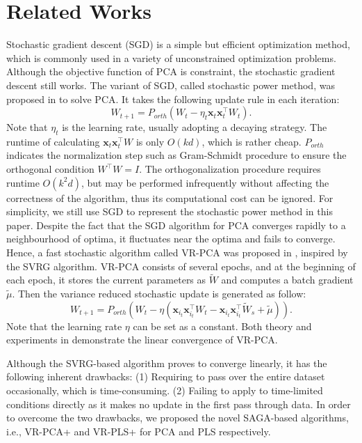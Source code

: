 \documentclass[runningheads,a4paper]{llncs}
\begin{document}
\section{Related Works}
 Stochastic gradient descent (SGD) is a simple but efficient optimization method, which is commonly used in a variety of unconstrained optimization problems. Although the objective function of PCA is constraint, the stochastic gradient descent still works. The variant of SGD, called stochastic power method, was proposed in \citep{Arora2014Stochastic} to solve PCA. It takes the following update rule in each iteration:
 \begin{equation}
 \label{sgd-pca}
 W_{t+1} = P_{orth}(W_{t} - \eta_t \mathbf{x}_{t}\mathbf{x}_{t}^{\top}W_{t}).
 \end{equation}
 Note that $\eta_t$ is the learning rate, usually adopting a decaying strategy.
 The runtime of calculating $\mathbf{x}_{t}\mathbf{x}_{t}^{\top}W$ is only $O(kd)$, which is rather cheap. $P_{orth}$ indicates the normalization step such as  Gram-Schmidt procedure to ensure the orthogonal condition $W^{\top}W=I$. The orthogonalization procedure requires runtime $O(k^2d)$, but may be performed infrequently without affecting the correctness of the algorithm, thus its computational cost can be ignored.
For simplicity, we still use SGD to represent the stochastic power method in this paper.
Despite the fact that the SGD algorithm for PCA converges rapidly to a neighbourhood of optima, it fluctuates near the optima and fails to converge. Hence, a fast stochastic algorithm called VR-PCA was proposed in \citep{Shamir2015A}, inspired by the SVRG algorithm.  VR-PCA consists of several epochs, 
and at the beginning of each epoch, it stores the current parameters as $\tilde{W}$ and computes a batch gradient $\tilde{\mu}$. Then the variance reduced stochastic update is generated as follow:
 \begin{equation}
 \label{vr-sgd-pca}
 W_{t+1} = P_{orth}(W_{t} - \eta(\mathbf{x}_{i_t}\mathbf{x}_{i_t}^{\top}W_{t}- \mathbf{x}_{i_t}\mathbf{x}_{i_t}^{\top}\tilde{W}_{s}+\tilde{\mu})).
 \end{equation}
 Note that the learning rate $\eta$ can be set as a constant.
Both theory and experiments in \citep{Shamir2015A} demonstrate the linear convergence of VR-PCA.
 
Although the SVRG-based algorithm proves to converge linearly, it has the following inherent drawbacks:
(1) Requiring to pass over the entire dataset occasionally, which is time-consuming. (2)  Failing to apply to time-limited conditions directly as it makes no update in the first pass through data. 
In order to overcome the two drawbacks, we proposed the novel SAGA-based algorithms, i.e., VR-PCA+ and VR-PLS+ for PCA and PLS respectively. 
\end{document}
